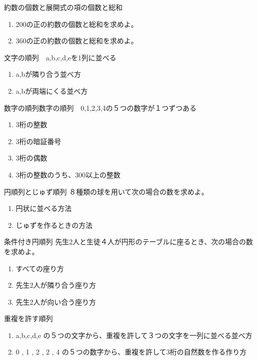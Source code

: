 \documentclass[10pt,dvipdfmx]{jsarticle}
\begin{document}
\begin{itembox}[l]{約数の個数と展開式の項の個数と総和}
  \begin{enumerate}
    \item 200の正の約数の個数と総和を求めよ。
    \item 360の正の約数の個数と総和を求めよ。
  \end{enumerate}
\end{itembox}
\begin{itembox}[l]{文字の順列　a,b,c,d,eを1列に並べる}
  \begin{enumerate}
    \item a,bが隣り合う並べ方
    \item a,bが両端にくる並べ方
  \end{enumerate}
\end{itembox}
\begin{itembox}[l]{数字の順列数字の順列　0,1,2,3,4の５つの数字が１つずつある}
  \begin{enumerate}
    \item 3桁の整数
    \item 3桁の暗証番号
    \item 3桁の偶数
    \item 3桁の整数のうち、300以上の整数
  \end{enumerate}
\end{itembox}
\begin{itembox}[l]{円順列とじゅず順列}
  ８種類の球を用いて次の場合の数を求めよ。
  \begin{enumerate}
    \item 円状に並べる方法
    \item じゅずを作るときの方法
  \end{enumerate}
\end{itembox}
\begin{itembox}[l]{条件付き円順列}
  先生2人と生徒４人が円形のテーブルに座るとき、次の場合の数を求めよ。
  \begin{enumerate}
    \item すべての座り方
    \item 先生2人が隣り合う座り方
    \item 先生2人が向い合う座り方
  \end{enumerate}
\end{itembox}
\begin{itembox}[l]{重複を許す順列}
  \begin{enumerate}
    \item a,b,c,d,e の５つの文字から、重複を許して３つの文字を一列に並べる並べ方
    \item 0 , 1 , 2 , 2 , 4 の５つの数字から、重複を許して3桁の自然数を作る作り方
  \end{enumerate}
\end{itembox}
\end{document}
